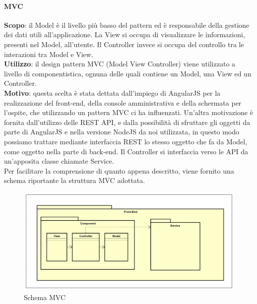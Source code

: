 \documentclass[../DefinizioneDiProdotto.tex]{subfiles}
\begin{document}
			\paragraph{MVC}\mbox{}
			\begin{addmargin}[1em]{2em}%
				\textbf{Scopo}: il Model è il livello più basso del pattern ed è responsabile della gestione dei dati utili all'applicazione. La View si occupa di visualizzare le informazioni, presenti nel Model, all'utente. Il Controller invece si occupa del controllo tra le interazioni tra Model e View.\\
				\textbf{Utilizzo}: il design pattern MVC (Model View Controller) viene utilizzato a livello di componentistica, ognuna delle quali contiene un Model, una View ed un Controller.\\
				\textbf{Motivo}: questa scelta è stata dettata dall'impiego di AngularJS per la realizzazione del front-end, della console amministrativa e della schermata per l'ospite, che utilizzando un pattern MVC ci ha influenzati. Un'altra motivazione è fornita dall'utilizzo delle REST API, e dalla possibilità di sfruttare gli oggetti da parte di AngularJS e nella versione NodeJS da noi utilizzata, in questo modo possiamo trattare mediante interfaccia REST lo stesso oggetto che fa da Model, come oggetto nella parte di back-end. Il Controller si interfaccia verso le API da un'apposita classe chiamate Service.\\
Per facilitare la comprensione di quanto appena descritto, viene fornito una schema riportante la struttura MVC adottata.
			\end{addmargin}
			\newpage
			\begin{figure}[!h]
			\centering
				\includegraphics[width=\textwidth]{Architettura/MVC.png}
				\caption{Schema MVC}
			\end{figure}
\end{document}
